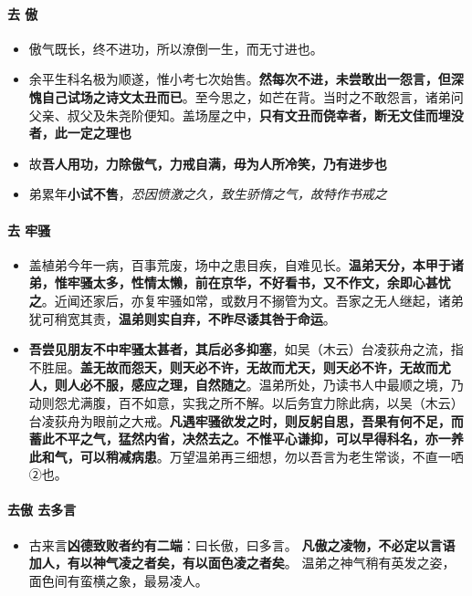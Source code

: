 \documentclass[UTF8,a4paper,8pt]{ctexbook}
\begin{document}
		 \paragraph{去 傲}
			 \begin{itemize}
			 	\item  傲气既长，终不进功，所以潦倒一生，而无寸进也。
			 	\item  余平生科名极为顺遂，惟小考七次始售。\textbf{然每次不进，未尝敢出一怨言，但深愧自己试场之诗文太丑而已}。至今思之，如芒在背。当时之不敢怨言，诸弟问父亲、叔父及朱尧阶便知。盖场屋之中，\textbf{只有文丑而侥幸者，断无文佳而埋没者，此一定之理也}
			 	\item  故\textbf{吾人用功，力除傲气，力戒自满，毋为人所冷笑，乃有进步也}
			 	\item  弟累年\textbf{小试不售}，\textit{恐因愤激之久，致生骄惰之气，故特作书戒之}
			 \end{itemize}
		  
		 \paragraph{去 牢骚}
			 \begin{itemize}
			 	\item 盖植弟今年一病，百事荒废，场中之患目疾，自难见长。\textbf{温弟天分，本甲于诸弟，惟牢骚太多，性情太懒，前在京华，不好看书，又不作文，余即心甚忧之}。近闻还家后，亦复牢骚如常，或数月不搦管为文。吾家之无人继起，诸弟犹可稍宽其责，\textbf{温弟则实自弃，不昨尽诿其咎于命运}。
			 	\item \textbf{吾尝见朋友不中牢骚太甚者，其后必多抑塞}，如吴（木云）台凌荻舟之流，指不胜屈。\textbf{盖无故而怨天，则天必不许，无故而尤天，则天必不许，无故而尤人，则人必不服，感应之理，自然随之}。温弟所处，乃读书人中最顺之境，乃动则怨尤满腹，百不如意，实我之所不解。以后务宜力除此病，以吴（木云）台凌荻舟为眼前之大戒。\textbf{凡遇牢骚欲发之时，则反躬自思，吾果有何不足，而蓄此不平之气，猛然内省，决然去之。不惟平心谦抑，可以早得科名，亦一养此和气，可以稍减病患}。万望温弟再三细想，勿以吾言为老生常谈，不直一哂②也。
			 \end{itemize}
			 
		 \paragraph{去傲 去多言}
			 \begin{itemize}
			 	\item 古来言\textbf{凶德致败者约有二端}：曰长傲，曰多言。 \textbf{凡傲之凌物，不必定以言语加人，有以神气凌之者矣，有以面色凌之者矣}。 温弟之神气稍有英发之姿，面色间有蛮横之象，最易凌人。
			 \end{itemize}
		
\end{document}

